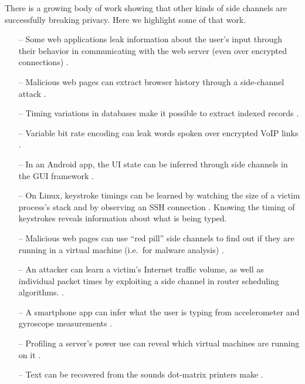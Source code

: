 \documentclass[letterpaper,twocolumn,10pt]{article}
\begin{document}
There is a growing body of work showing that other kinds of side channels are
successfully breaking privacy. Here we highlight some of that work.

\begin{itemize}
    \item[--] Some web applications leak information about the user's input through
          their behavior in communicating with the web server (even over
          encrypted connections) \cite{bortz2007exposing, chen2010side}.
    \item[--] Malicious web pages can extract browser history through a side-channel attack
          \cite{weinberg2011still}. 
    \item[--] Timing variations in databases make it possible to extract
          indexed records \cite{futoransky2007nd2db}.
    \item[--] Variable bit rate encoding can leak words spoken over encrypted
        VoIP links \cite{white2011phonotactic}.
    \item[--] In an Android app, the UI state can be inferred through side channels
          in the GUI framework \cite{chen2014peeking}.
    \item[--] On Linux, keystroke timings can be learned by watching the size of
          a victim process's stack \cite{zhang2009peeping} and by observing an
          SSH connection \cite{song2001timing}. Knowing the timing of keystrokes
          reveals information about what is being typed.
    \item[--] Malicious web pages can use ``red pill'' side channels to find out if
          they are running in a virtual machine (i.e.\ for malware analysis)
          \cite{ho2014tick}.
    \item[--] An attacker can learn a victim's Internet traffic volume, as well as
          individual packet times by exploiting a side channel in router
          scheduling algorithms. \cite{kadloor2010low}.
    \item[--] A smartphone app can infer what the user is typing from accelerometer
          and gyroscope measurements \cite{owusu2012accessory,
          cai2012practicality}.
    \item[--] Profiling a server's power use can reveal which virtual machines
        are running on it \cite{hlavacs2011energy}.
    \item[--] Text can be recovered from the sounds dot-matrix printers make
          \cite{backes2010acoustic}.
\end{itemize}
\end{document}
